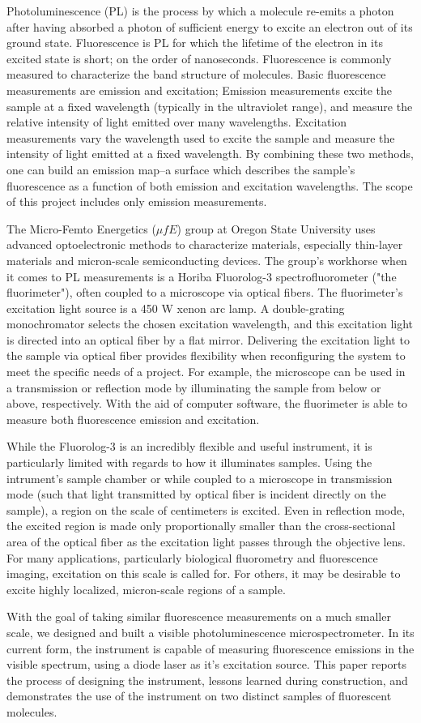 Photoluminescence (PL) is the process by which a molecule re-emits a photon after having absorbed a photon of sufficient energy to excite an electron out of its ground state. Fluorescence is PL for which the lifetime of the electron in its excited state is short; on the order of nanoseconds. Fluorescence is commonly measured to characterize the band structure of molecules. Basic fluorescence measurements are emission and excitation; Emission measurements excite the sample at a fixed wavelength (typically in the ultraviolet range), and measure the relative intensity of light emitted over many wavelengths. Excitation measurements vary the wavelength used to excite the sample and measure the intensity of light emitted at a fixed wavelength. By combining these two methods, one can build an emission map--a surface which describes the sample's fluorescence as a function of both emission and excitation wavelengths. The scope of this project includes only emission measurements.

The Micro-Femto Energetics ($\mu fE$) group at Oregon State University uses advanced optoelectronic methods to characterize materials, especially thin-layer materials and micron-scale semiconducting devices. The group's workhorse when it comes to PL measurements is a Horiba Fluorolog-3 spectrofluorometer ("the fluorimeter"), often coupled to a microscope via optical fibers. The fluorimeter's excitation light source is a 450 W xenon arc lamp. A double-grating monochromator selects the chosen excitation wavelength, and this excitation light is directed into an optical fiber by a flat mirror. Delivering the excitation light to the sample via optical fiber provides flexibility when reconfiguring the system to meet the specific needs of a project. For example, the microscope can be used in a transmission or reflection mode by illuminating the sample from below or above, respectively. With the aid of computer software, the fluorimeter is able to measure both fluorescence emission and excitation.

While the Fluorolog-3 is an incredibly flexible and useful instrument, it is particularly limited with regards to how it illuminates samples. Using the intrument's sample chamber or while coupled to a microscope in transmission mode (such that light transmitted by optical fiber is incident directly on the sample), a region on the scale of centimeters is excited. Even in reflection mode, the excited region is made only proportionally smaller than the cross-sectional area of the optical fiber as the excitation light passes through the objective lens. For many applications, particularly biological fluorometry and fluorescence imaging, excitation on this scale is called for. For others, it may be desirable to excite highly localized, micron-scale regions of a sample.

With the goal of taking similar fluorescence measurements on a much smaller scale, we designed and built a visible photoluminescence microspectrometer. In its current form, the instrument is capable of measuring fluorescence emissions in the visible spectrum, using a diode laser as it's excitation source. This paper reports the process of designing the instrument, lessons learned during construction, and demonstrates the use of the instrument on two distinct samples of fluorescent molecules.
